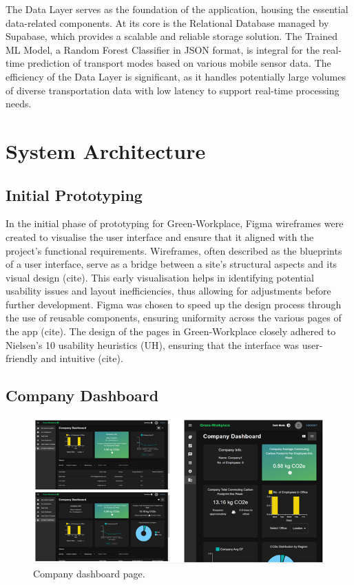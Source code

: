 \documentclass{l4proj}
\begin{document}
The Data Layer serves as the foundation of the application, housing the essential data-related components. At its core is the Relational Database managed by Supabase, which provides a scalable and reliable storage solution. The Trained ML Model, a Random Forest Classifier in JSON format, is integral for the real-time prediction of transport modes based on various mobile sensor data. The efficiency of the Data Layer is significant, as it handles potentially large volumes of diverse transportation data with low latency to support real-time processing needs.


\section{System Architecture}

\subsection{Initial Prototyping}
In the initial phase of prototyping for Green-Workplace, Figma wireframes were created to visualise the user interface and ensure that it aligned with the project's functional requirements. Wireframes, often described as the blueprints of a user interface, serve as a bridge between a site's structural aspects and its visual design (cite). This early visualisation helps in identifying potential usability issues and layout inefficiencies, thus allowing for adjustments before further development. Figma was chosen to speed up the design process through the use of reusable components, ensuring uniformity across the various pages of the app (cite). The design of the pages in Green-Workplace closely adhered to Nielsen’s 10 usability heuristics (UH), ensuring that the interface was user-friendly and intuitive (cite).

\subsection{Company Dashboard}

\begin{figure}[ht]
  \centering
  \includegraphics[width=\linewidth]{images/company dashboard.png}
  \caption{Company dashboard page.}
  \label{fig:companydashboard}
\end{figure}
\end{document}
